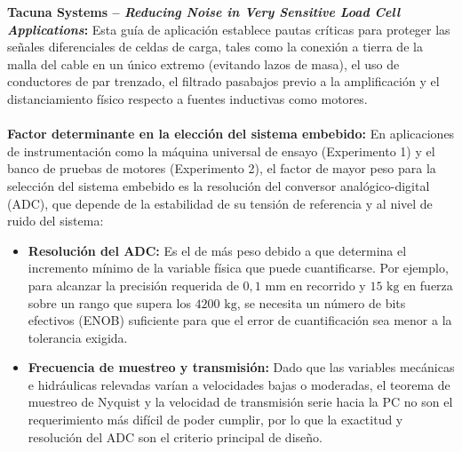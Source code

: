 \textbf{Tacuna Systems -- \textit{Reducing Noise in Very Sensitive Load Cell Applications}:} Esta guía de aplicación establece pautas críticas para proteger las señales diferenciales de celdas de carga, tales como la conexión a tierra de la malla del cable en un único extremo (evitando lazos de masa), el uso de conductores de par trenzado, el filtrado pasabajos previo a la amplificación y el distanciamiento físico respecto a fuentes inductivas como motores.\\
\\
\textbf{Factor determinante en la elección del sistema embebido:} En aplicaciones de instrumentación como la máquina universal de ensayo (Experimento 1) y el banco de pruebas de motores (Experimento 2), el factor de mayor peso para la selección del sistema embebido es la resolución del conversor analógico-digital (ADC), que depende de la estabilidad de su tensión de referencia y al nivel de ruido del sistema:
\begin{itemize}
    \item \textbf{Resolución del ADC:} Es el de más peso debido a que determina el incremento mínimo de la variable física que puede cuantificarse. Por ejemplo, para alcanzar la precisión requerida de $0,1\text{ mm}$ en recorrido y $15\text{ kg}$ en fuerza sobre un rango que supera los $4200\text{ kg}$, se necesita un número de bits efectivos (ENOB) suficiente para que el error de cuantificación sea menor a la tolerancia exigida.
    \item \textbf{Frecuencia de muestreo y transmisión:} Dado que las variables mecánicas e hidráulicas relevadas varían a velocidades bajas o moderadas, el teorema de muestreo de Nyquist y la velocidad de transmisión serie hacia la PC no son el requerimiento más difícil de poder cumplir, por lo que la exactitud y resolución del ADC son el criterio principal de diseño.
\end{itemize}


